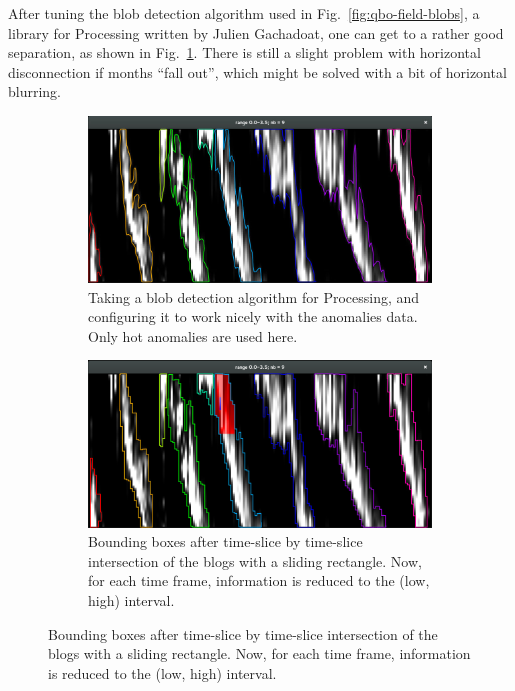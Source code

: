 \documentclass[11pt,a4paper]{article}
\newcommand{\figref}[1]{Fig.~\ref{#1}}
\begin{document}
After tuning the blob detection algorithm used in \figref{fig:qbo-field-blobs}, a library for Processing written by Julien Gachadoat, one can get to a rather good separation, as shown in \figref{fig:qbo-blobs-experiment}. There is still a slight problem with horizontal disconnection if months ``fall out'', which might be solved with a bit of horizontal blurring.

\begin{figure}
\centering
\begin{subfigure}[b]{\textwidth}%
\includegraphics[width=\textwidth]{figures/qbo-blobs-experiment.jpg}
\caption{Taking a blob detection algorithm for Processing, and configuring it to work nicely with the anomalies data. Only hot anomalies are used here.}
\label{fig:qbo-blobs-experiment}
\end{subfigure}
%
\begin{subfigure}[b]{\textwidth}%
\includegraphics[width=\textwidth]{figures/qbo-blobs-experiment-bounds.png}
\caption{Bounding boxes after time-slice by time-slice intersection of the blogs with a sliding rectangle. Now, for each time frame, information is reduced to the (low, high) interval.}
\label{fig:qbo-blobs-experiment-bounds}
\end{subfigure}
\end{figure}
%
\end{document}
